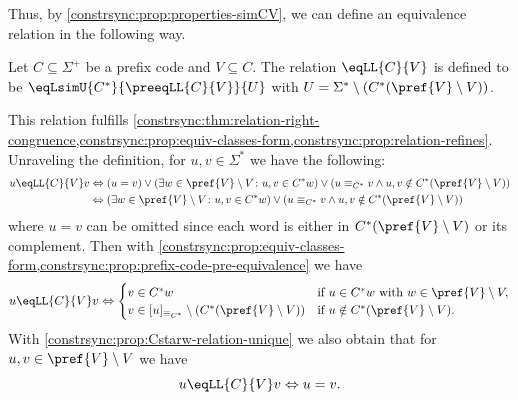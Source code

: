 Thus, by \cref{constrsync:prop:properties-simCV}, we can define an equivalence
relation in the following way.

\begin{definition} \label{def:eqLL}
	Let $C \subseteq \Sigma^+$ be a prefix code and $V \subseteq C$.
	The relation $\eqLL{C}{V}$ is defined
	to be $\eqLsimU{C^*}{\preeqLL{C}{V}}{U}$ with $U = \Sigma^* \setminus ( C^* ( \pref{V} \setminus V) )$.
\end{definition}

This relation fulfills
 \cref{constrsync:thm:relation-right-congruence,constrsync:prop:equiv-classes-form,constrsync:prop:relation-refines}.
Unraveling the definition, for $u,v \in \Sigma^*$ we have the following:
\begin{align*}
u \eqLL{C}{V} v
& \Leftrightarrow
( u = v ) \lor ( \exists w \in \pref{V} \setminus V \colon u,v \in C^*w ) \lor
( u \equiv_{C^*} v \land u,v \notin C^* (\pref{V} \setminus V) ) \\
& \Leftrightarrow
( \exists w \in \pref{V} \setminus V \colon u,v \in C^*w ) \lor
( u \equiv_{C^*} v \land u,v \notin C^* (\pref{V} \setminus V) )
\end{align*}
where $u = v$ can be omitted since each word is either in $C^*(\pref{V}\setminus V)$
or its complement. Then with \cref{constrsync:prop:equiv-classes-form,constrsync:prop:prefix-code-pre-equivalence}
we have
\begin{equation}\label{constrsync:eqn:eqLLCV}
u \eqLL{C}{V} v \Leftrightarrow
\begin{cases}
	v \in C^*w & \text{if } u \in C^*w \text{ with } w \in \pref{V} \setminus V, \\
	v \in [u]_{\equiv_{C^*}} \setminus ( C^* ( \pref{V} \setminus V ) ) & \text{if } u \notin C^* ( \pref{V} \setminus V ).
\end{cases}
\end{equation}
With \cref{constrsync:prop:Cstarw-relation-unique} we also obtain that for $u,v \in \pref{V}\setminus V$
we have 
\begin{equation} \label{constrsync:eqn:eqLLCV-unique-on-prefV}
	u \eqLL{C}{V} v \Leftrightarrow u = v.
\end{equation} 


